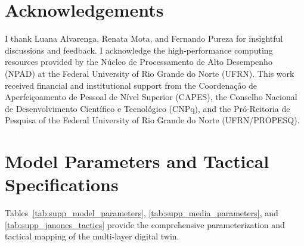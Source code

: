\documentclass[a4paper,fleqn]{cas-dc}
\begin{document}
\section*{Acknowledgements}
I thank Luana Alvarenga, Renata Mota, and Fernando Pureza for insightful discussions and feedback. I acknowledge the high-performance computing resources provided by the N{\'u}cleo de Processamento de Alto Desempenho (NPAD) at the Federal University of Rio Grande do Norte (UFRN). This work received financial and institutional support from the Coordena{\c{c}}{\~a}o de Aperfei{\c{c}}oamento de Pessoal de N{\'i}vel Superior (CAPES), the Conselho Nacional de Desenvolvimento Cient{\'i}fico e Tecnol{\'o}gico (CNPq), and the Pr{\'o}-Reitoria de Pesquisa of the Federal University of Rio Grande do Norte (UFRN/PROPESQ).

\appendix
\section{Model Parameters and Tactical Specifications}
\label{app:parameters}

Tables~\ref{tab:supp_model_parameters}, \ref{tab:supp_media_parameters}, and \ref{tab:supp_janones_tactics} provide the comprehensive parameterization and tactical mapping of the multi-layer digital twin.
\end{document}
